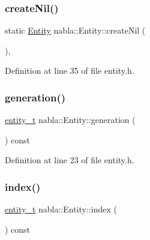 \subsubsection{\texorpdfstring{createNil()}{createNil()}}
{\footnotesize\ttfamily static \mbox{\hyperlink{structnabla_1_1_entity}{Entity}} nabla\+::\+Entity\+::create\+Nil (\begin{DoxyParamCaption}{ }\end{DoxyParamCaption})\hspace{0.3cm}{\ttfamily [inline]}, {\ttfamily [static]}}



Definition at line 35 of file entity.\+h.

\mbox{\label{structnabla_1_1_entity_a5573713a19571f575b0245a8ed438172}} 
\subsubsection{\texorpdfstring{generation()}{generation()}}
{\footnotesize\ttfamily \mbox{\hyperlink{structnabla_1_1_entity_a0e7d5826cda759dfeb3a81c8175f3b4d}{entity\+\_\+t}} nabla\+::\+Entity\+::generation (\begin{DoxyParamCaption}{ }\end{DoxyParamCaption}) const\hspace{0.3cm}{\ttfamily [inline]}}



Definition at line 23 of file entity.\+h.

\mbox{\label{structnabla_1_1_entity_a4305d04861f997e061c98ff154d67063}} 
\subsubsection{\texorpdfstring{index()}{index()}}
{\footnotesize\ttfamily \mbox{\hyperlink{structnabla_1_1_entity_a0e7d5826cda759dfeb3a81c8175f3b4d}{entity\+\_\+t}} nabla\+::\+Entity\+::index (\begin{DoxyParamCaption}{ }\end{DoxyParamCaption}) const\hspace{0.3cm}{\ttfamily [inline]}}



